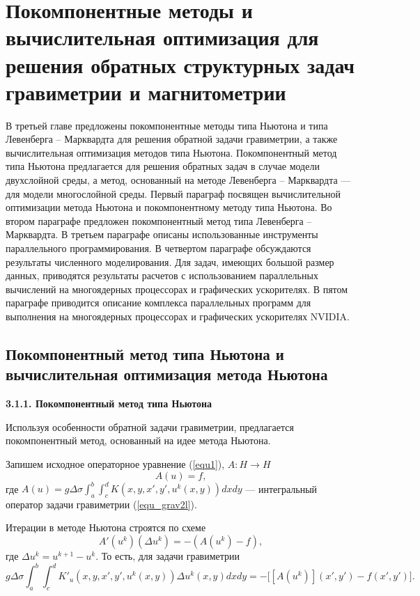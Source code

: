 \chapter{Покомпонентные методы и вычислительная оптимизация для решения обратных структурных задач гравиметрии и магнитометрии}

В третьей главе предложены покомпонентные методы типа Ньютона и типа Левенберга -- Марквардта для решения обратной задачи гравиметрии, а также вычислительная оптимизация методов типа Ньютона. Покомпонентный метод типа Ньютона предлагается для решения обратных задач в случае модели двухслойной среды, а метод, основанный на методе Левенберга -- Марквардта --- для модели многослойной среды. Первый параграф посвящен вычислительной оптимизации метода Ньютона и покомпонентному методу типа Ньютона. Во втором параграфе предложен покомпонентный метод типа Левенберга -- Марквардта. В третьем параграфе описаны использованные инструменты параллельного программирования. В четвертом параграфе обсуждаются результаты численного моделирования. Для задач, имеющих большой размер данных, приводятся результаты расчетов с использованием параллельных вычислений на многоядерных процессорах и графических ускорителях. В пятом параграфе приводится описание комплекса параллельных программ для выполнения на многоядерных процессорах и графических ускорителях NVIDIA.

\newpage

\section{Покомпонентный метод типа Ньютона и вычислительная оптимизация метода Ньютона}

{\bfseries 3.1.1. Покомпонентный метод типа Ньютона}

Используя особенности обратной задачи гравиметрии, предлагается покомпонентный метод, основанный на идее метода Ньютона.

Запишем исходное операторное уравнение (\ref{equ1}), $A: H\to H$
$$A(u)=f,$$
где $A(u)=g\Delta\sigma\int_{a}^{b}\int_{c}^{d}K(x,y, x',y',u^k(x,y))dxdy$ --- интегральный оператор задачи гравиметрии (\ref{equ_grav2l}).

Итерации в методе Ньютона строятся по схеме
$$A'(u^k)(\Delta u^k)=-(A(u^k)-f),$$ где $\Delta u^k=u^{k+1}-u^k$.
То есть, для задачи гравиметрии
\begin{equation}\label{equ_grav_nwt}
g\Delta\sigma\int_{a}^{b}\int_{c}^{d}K'_u(x,y, x',y',u^k(x,y))\Delta u^k(x,y) dxdy=-\big[[A(u^k)](x',y')-f(x',y')\big].
\end{equation}

